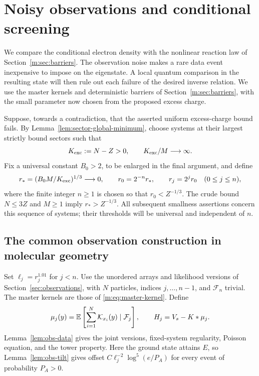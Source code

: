 \section{Noisy observations and conditional screening}\label{m:sec:conditioning}

We compare the conditional electron density with the nonlinear reaction
law of Section~\ref{m:sec:barriers}. The observation noise makes a rare
data event inexpensive to impose on the eigenstate. A local quantum
comparison in the resulting state will then rule out each failure of
the desired inverse relation. We use the master kernels and deterministic
barriers of Section~\ref{m:sec:barriers}, with the small parameter now
chosen from the proposed excess charge.

Suppose, towards a contradiction, that the asserted uniform excess-charge
bound fails.  By Lemma~\ref{lem:sector-global-minimum}, choose systems at
their largest strictly bound sectors such that
\[
 K_{\rm exc}:=N-Z>0,\qquad K_{\rm exc}/M\longrightarrow\infty.
\]
Fix a universal constant $B_0>2$, to be enlarged in the final argument,
and define
\begin{equation}\label{m:eq:barrier-scales}
 r_*=(B_0M/K_{\rm exc})^{1/3}\longrightarrow0,\qquad
 r_0=2^{-n}r_*,\qquad r_j=2^jr_0\quad(0\le j\le n),
\end{equation}
where the finite integer $n\ge1$ is chosen so that $r_0<Z^{-1/3}$.
The crude bound $N\le3Z$ and $M\ge1$ imply $r_*>Z^{-1/3}$.
All subsequent smallness assertions concern this sequence of systems;
their thresholds will be universal and independent of $n$.


\subsection{The common observation construction in molecular geometry}

Set $\ell_j=r_j^{1.01}$ for $j<n$. Use the unordered arrays and likelihood
versions of Section~\ref{sec:observations}, with $N$ particles, indices
$j,\ldots,n-1$, and $\mathcal F_n$ trivial. The master kernels are those
of \eqref{m:eq:master-kernel}. Define
\[
 \mu_j(y)=\mathbb E\left[\sum_{i=1}^N\mathcal K_{x_i}(y)\mid\mathcal F_j\right],
 \qquad H_j=V_s-K*\mu_j.
\]
Lemma~\ref{lem:obs-data} gives the joint versions, fixed-system regularity,
Poisson equation, and the tower property. Here the ground state attains
$E$, so Lemma~\ref{lem:obs-tilt} gives offset
$C\ell_j^{-2}\log^5(e/P_A)$ for every event of probability $P_A>0$.

